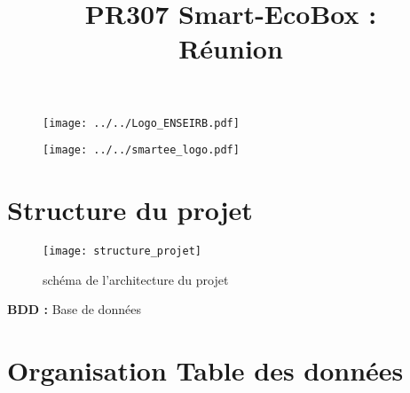 \documentclass[10pt,a4paper]{article}
\title{PR307 Smart-EcoBox : \\ Réunion}
\begin{document}
\maketitle

\begin{figure}[ht]
\begin{center}
\noindent \texttt{[image: ../../Logo\_ENSEIRB.pdf]}
\end{center}
\end{figure}
\begin{figure}[ht]
\begin{center}
\noindent \texttt{[image: ../../smartee\_logo.pdf]}
\end{center}
\end{figure}


\newpage

\tableofcontents
\newpage
\section {Structure du projet}

\begin{figure}[h]
\centering
\texttt{[image: structure\_projet]}
\caption{schéma de l'architecture du projet}
\label{fig:my_label}
\end{figure}

\textbf{BDD :} Base de données
\section{Organisation Table des données}
\end{document}
